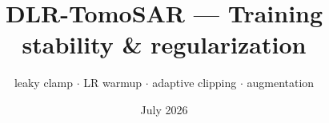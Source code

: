 \documentclass[aspectratio=169,9pt]{beamer}
\title{\textbf{DLR-TomoSAR --- Training stability \& regularization}}
\subtitle{leaky clamp \; $\cdot$ \; LR warmup \; $\cdot$ \; adaptive clipping \; $\cdot$ \; augmentation}
\date{\small July 2026}
\author{}
\begin{document}
\begin{frame}[plain]
  \titlepage
\end{frame}



\end{document}
